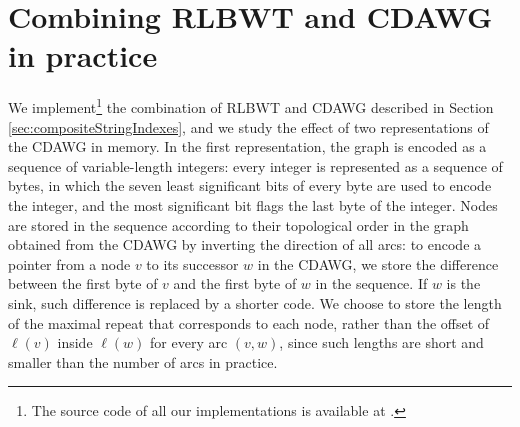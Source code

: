 \documentclass[a4paper,UKenglish]{lipics-v2016}
\begin{document}
 























































\section{Combining RLBWT and CDAWG in practice}

We implement\footnote{The source code of all our implementations is available at \cite{githubMathieu}.} the combination of RLBWT and CDAWG described in Section \ref{sec:compositeStringIndexes}, and we study the effect of two representations of the CDAWG in memory. In the first representation, the graph is encoded as a sequence of variable-length integers: every integer is represented as a sequence of bytes, in which the seven least significant bits of every byte are used to encode the integer, and the most significant bit flags the last byte of the integer. Nodes are stored in the sequence according to their topological order in the graph obtained from the CDAWG by inverting the direction of all arcs: to encode a pointer from a node $v$ to its successor $w$ in the CDAWG, we store the difference between the first byte of $v$ and the first byte of $w$ in the sequence. If $w$ is the sink, such difference is replaced by a shorter code. We choose to store the length of the maximal repeat that corresponds to each node, rather than the offset of $\ell(v)$ inside $\ell(w)$ for every arc $(v,w)$, since such lengths are short and smaller than the number of arcs in practice.
\end{document}
